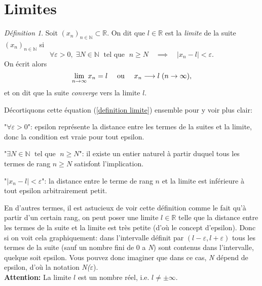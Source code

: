 \documentclass[oneside,12pt,french,table]{book}
\theoremstyle{definition}
\theoremstyle{plain}
\theoremstyle{remark}
\newtheorem{defi}[definition]{Définition}
\newcommand{\Nn}{{\mathbb{N}}}
\newcommand{\Rr}{{\mathbb{R}}}
\begin{document}
\section{Limites}
\begin{defi}
Soit $(x_n)_{n\in\Nn}\subset \Rr$. On dit que $l\in \Rr$ est la \textit{limite} de la suite  $(x_n)_{n\in\Nn}$ si 
\begin{equation}\label{definition limite}
    \forall \varepsilon>0, \; \exists N\in\Nn \; \text{ tel que } \; n\geq N \quad \implies \quad |x_n-l|<\varepsilon.
\end{equation}
On écrit alors 
\begin{equation*}
    \lim_{n\to\infty} x_n= l \text{ \quad ou \quad } x_n\longrightarrow l \; (n \rightarrow \infty),
\end{equation*}
et on dit que la suite \textit{converge} vers la limite $l$.     
\end{defi}
Décortiquons cette équation (\ref{definition limite}) ensemble pour y voir plus clair: 

"$\forall \varepsilon>0$": epsilon représente la distance entre les termes de la suites et la limite, donc la condition est vraie pour tout epsilon.

"$\exists N\in\Nn \; \text{ tel que } \; n\geq N$": il existe un entier naturel à partir duquel tous les termes de rang $n\geq N$ satisfont l'implication.

"$|x_n-l|<\varepsilon$": la distance entre le terme de rang $n$ et la limite est inférieure à tout epsilon arbitrairement petit.

En d'autres termes, il est astucieux de voir cette définition comme le fait qu'à partir d'un certain rang, on peut poser une limite $l\in\Rr$ telle que la distance entre les termes de la suite et la limite est très petite (d'où le concept d'epsilon).
Donc si on voit cela graphiquement: dans l'intervalle définit par $(l-\varepsilon,l+\varepsilon)$ tous les termes de la suite (sauf un nombre fini de 0 a \textit{N}) sont contenus dans l'intervalle, quelque soit epsilon.
Vous pouvez donc imaginer que dans ce cas, \textit{N} dépend de epsilon, d'où la notation \textit{N(}$\varepsilon$).
\\\textbf{Attention: } La limite $l$ est un nombre réel, i.e. $l\neq\pm\infty$. 
\end{document}
